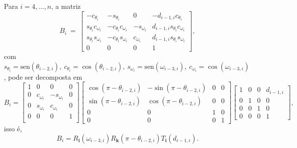 \documentclass[a4paper,12pt]{report}
\theoremstyle{plain}
\theoremstyle{definition}
\begin{document}
	Para $i=4, ..., n$, a matriz
	$$
	B_i\:=\:
	\begin{bmatrix}
		-c_{\theta_{i}} & -s_{\theta_{i}} & 0 & -d_{i-1,i}c_{\theta_{i}}\\ 
		s_{\theta_{i}}c_{\omega_{i}} & -c_{\theta_{i}}c_{\omega_{i}}
		& -s_{\omega_{i}} & d_{i-1,i}s_{\theta_{i}}c_{\omega_{i}}\\ 
		s_{\theta_{i}}s_{\omega_{i}} & -c_{\theta_{i}}s_{\omega_{i}} & c_{\omega_{i}} & d_{i-1,i}s_{\theta_{i}}s_{\omega_{i}}\\ 
		0 & 0 & 0 & 1
	\end{bmatrix},
	$$
	com $s_{\theta_{i}}=\mbox{sen} (\theta_{i-2, i}),\: c_{\theta_{i}}=\cos (\theta_{i-2, i}),\: s_{\omega_{i}}=\mbox{sen} (\omega_{i-3, i}),\: c_{\omega_{i}}=\cos (\omega_{i-3, i})$, pode ser decomposta em
	$$B_i =
	\begin{bmatrix}
		1       &          0       & 0 & 0\\
		0 &  c_{\omega_{i}} & -s_{\omega_{i}} & 0 \\ 
		0 &s_{\omega_{i}} &  c_{\omega_{i}}  & 0 \\ 
		0       &          0       & 0&1\\
	\end{bmatrix}
	\begin{bmatrix}
		\cos(\pi-\theta_{i-2, i}) & -\sin(\pi-\theta_{i-2, i}) & 0 &0\\ 
		\sin(\pi-\theta_{i-2, i}) & \cos(\pi-\theta_{i-2, i})  & 0 &0\\ 
		0       &          0       & 1&0\\
		0 & 0& 0& 1
	\end{bmatrix}
	\begin{bmatrix}
		1&0 & 0& d_{i-1,i}\\
		0 & 1 & 0& 0\\
		0 & 0&1& 0\\
		0 & 0& 0& 1
	\end{bmatrix}
	,$$ isso é,
	$$B_i = R_{\mathbf i}(\omega_{i-3, i})R_{\mathbf k}(\pi-\theta_{i-2, i})T_{\mathbf i}(d_{i-1,i}).$$
	
\end{document}
